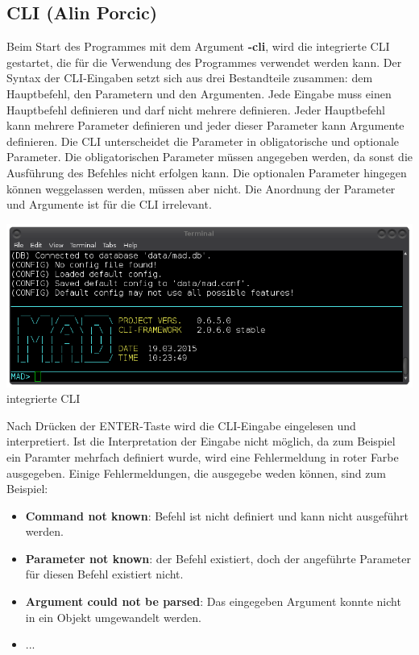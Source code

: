 \documentclass[12pt,a4paper]{report}
\begin{document}
\begin{onehalfspace}
\section{CLI (Alin Porcic)}

Beim Start des Programmes mit dem Argument \textbf{-cli}, wird die integrierte CLI gestartet, die für die Verwendung des Programmes verwendet werden kann. Der Syntax der CLI-Eingaben setzt sich aus drei Bestandteile zusammen: dem Hauptbefehl, den Parametern und den Argumenten. Jede Eingabe muss einen Hauptbefehl definieren und darf nicht mehrere definieren. Jeder Hauptbefehl kann mehrere Parameter definieren und jeder dieser Parameter kann Argumente definieren. Die CLI unterscheidet die Parameter in obligatorische und optionale Parameter. Die obligatorischen Parameter müssen angegeben werden, da sonst die Ausführung des Befehles nicht erfolgen kann. Die optionalen Parameter hingegen können weggelassen werden, müssen aber nicht. Die Anordnung der Parameter und Argumente ist für die CLI irrelevant.\\

\begin{center}
\includegraphics[scale=0.5]{img/cli_mad.png}\\
integrierte CLI
\end{center}

Nach Drücken der ENTER-Taste wird die CLI-Eingabe eingelesen und interpretiert. Ist die Interpretation der Eingabe nicht möglich, da zum Beispiel ein Paramter mehrfach definiert wurde, wird eine Fehlermeldung in roter Farbe ausgegeben. Einige Fehlermeldungen, die ausgegebe weden können, sind zum Beispiel:

\begin{itemize}
\item \textbf{Command not known}: Befehl ist nicht definiert und kann nicht ausgeführt werden.
\item \textbf{Parameter not known}: der Befehl existiert, doch der angeführte Parameter für diesen Befehl existiert nicht.
\item \textbf{Argument could not be parsed}: Das eingegeben Argument konnte nicht in ein Objekt umgewandelt werden.
\item ...
\end{itemize}


\end{onehalfspace}
\end{document}
